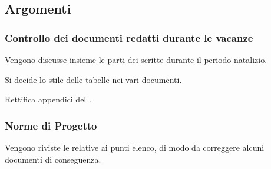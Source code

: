         \subsection{Argomenti}
            \subsubsection{Controllo dei documenti redatti durante le vacanze}
            Vengono discusse insieme le parti dei  scritte durante il periodo natalizio.\par
            Si decide lo stile delle tabelle nei vari documenti.\par
            Rettifica appendici del \PdQ.
            
            \subsubsection{Norme di Progetto}
            Vengono riviste le  relative ai punti elenco, di modo da correggere alcuni documenti di conseguenza.
            


